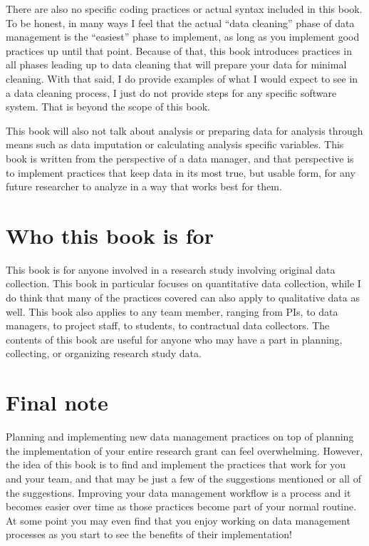 \documentclass[
]{book}
\begin{document}
There are also no specific coding practices or actual syntax included in this book. To be honest, in many ways I feel that the actual ``data cleaning'' phase of data management is the ``easiest'' phase to implement, as long as you implement good practices up until that point. Because of that, this book introduces practices in all phases leading up to data cleaning that will prepare your data for minimal cleaning. With that said, I do provide examples of what I would expect to see in a data cleaning process, I just do not provide steps for any specific software system. That is beyond the scope of this book.

This book will also not talk about analysis or preparing data for analysis through means such as data imputation or calculating analysis specific variables. This book is written from the perspective of a data manager, and that perspective is to implement practices that keep data in its most true, but usable form, for any future researcher to analyze in a way that works best for them.

\hypertarget{who-this-book-is-for}{%
\section{Who this book is for}\label{who-this-book-is-for}}

This book is for anyone involved in a research study involving original data collection. This book in particular focuses on quantitative data collection, while I do think that many of the practices covered can also apply to qualitative data as well. This book also applies to any team member, ranging from PIs, to data managers, to project staff, to students, to contractual data collectors. The contents of this book are useful for anyone who may have a part in planning, collecting, or organizing research study data.

\hypertarget{final-note}{%
\section{Final note}\label{final-note}}

Planning and implementing new data management practices on top of planning the implementation of your entire research grant can feel overwhelming. However, the idea of this book is to find and implement the practices that work for you and your team, and that may be just a few of the suggestions mentioned or all of the suggestions. Improving your data management workflow is a process and it becomes easier over time as those practices become part of your normal routine. At some point you may even find that you enjoy working on data management processes as you start to see the benefits of their implementation!
\end{document}
